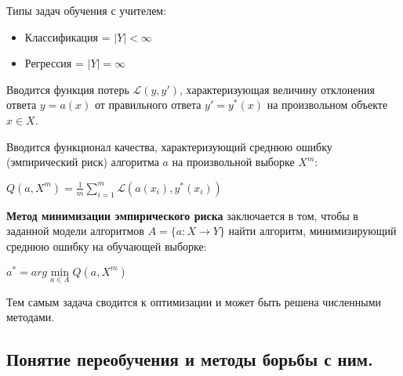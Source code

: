 \documentclass{article}
\begin{document}
Типы задач обучения с учителем:
\begin{itemize}
    \item Классификация = $|Y| < \infty$
    \item Регрессия = $|Y| = \infty$
\end{itemize}

Вводится функция потерь $\mathcal{L}(y, y')$, характеризующая величину
отклонения ответа $y = a(x)$ от правильного ответа $y' = y^*(x)$ на
произвольном объекте $x \in X$.

Вводится функционал качества, характеризующий среднюю ошибку
(эмпирический риск) алгоритма $a$ на произвольной выборке $X^m$:

$Q(a, X^m) = \frac{1}{m}\sum\limits_{i=1}^m \mathcal{L}(a(x_i), y^*(x_i))$

\textbf{Метод минимизации эмпирического риска} заключается в том, чтобы
в заданной модели алгоритмов $A = \{a: X \to Y\}$ найти алгоритм, минимизирующий
среднюю ошибку на обучающей выборке:

$a^* = arg \min\limits_{a \in A} Q(a, X^m)$

Тем самым задача сводится к оптимизации и может быть решена численными методами.

\subsection{Понятие переобучения и методы борьбы с ним.}

\end{document}
